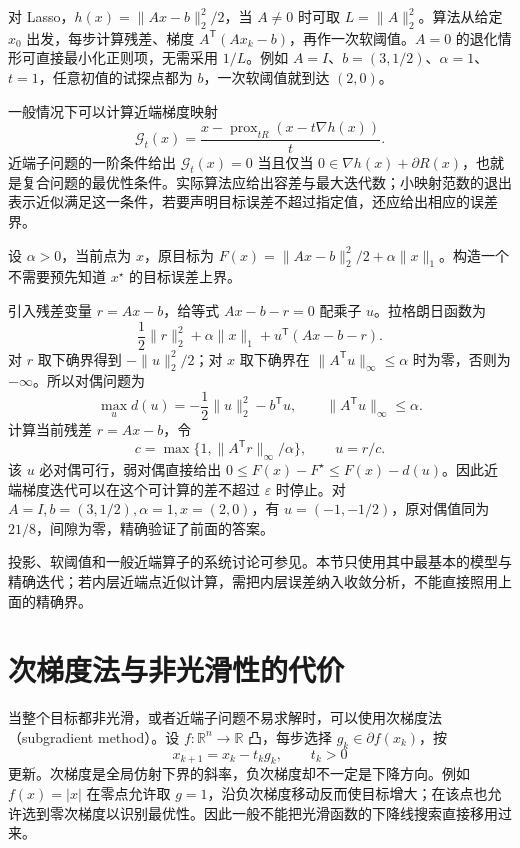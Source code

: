 对 Lasso，$h(x)=\|Ax-b\|_2^2/2$，当 $A\ne0$ 时可取 $L=\|A\|_2^2$。算法从给定 $x_0$ 出发，每步计算残差、梯度 $A^{\mathsf T}(Ax_k-b)$，再作一次软阈值。$A=0$ 的退化情形可直接最小化正则项，无需采用 $1/L$。例如 $A=I$、$b=(3,1/2)$、$\alpha=1$、$t=1$，任意初值的试探点都为 $b$，一次软阈值就到达 $(2,0)$。

一般情况下可以计算近端梯度映射
\[
 \mathcal G_t(x)=\frac{x-\operatorname{prox}_{tR}(x-t\nabla h(x))}{t}.
\]
近端子问题的一阶条件给出 $\mathcal G_t(x)=0$ 当且仅当
$0\in\nabla h(x)+\partial R(x)$，也就是复合问题的最优性条件。实际算法应给出容差与最大迭代数；小映射范数的退出表示近似满足这一条件，若要声明目标误差不超过指定值，还应给出相应的误差界。

\begin{example}
设 $\alpha>0$，当前点为 $x$，原目标为 $F(x)=\|Ax-b\|_2^2/2+\alpha\|x\|_1$。构造一个不需要预先知道 $x^\star$ 的目标误差上界。
\end{example}
\begin{solve}
引入残差变量 $r=Ax-b$，给等式 $Ax-b-r=0$ 配乘子 $u$。拉格朗日函数为
\[
 \frac12\|r\|_2^2+\alpha\|x\|_1+u^{\mathsf T}(Ax-b-r).
\]
对 $r$ 取下确界得到 $-\|u\|_2^2/2$；对 $x$ 取下确界在 $\|A^{\mathsf T}u\|_\infty\leq\alpha$ 时为零，否则为 $-\infty$。所以对偶问题为
\[
 \max_u d(u)=-\frac12\|u\|_2^2-b^{\mathsf T}u,
 \qquad \|A^{\mathsf T}u\|_\infty\leq\alpha.
\]
计算当前残差 $r=Ax-b$，令
\[
 c=\max\{1,\|A^{\mathsf T}r\|_\infty/\alpha\},\qquad u=r/c.
\]
该 $u$ 必对偶可行，弱对偶直接给出 $0\leq F(x)-F^\star\leq F(x)-d(u)$。因此近端梯度迭代可以在这个可计算的差不超过 $\varepsilon$ 时停止。对 $A=I,b=(3,1/2),\alpha=1,x=(2,0)$，有 $u=(-1,-1/2)$，原对偶值同为 $21/8$，间隙为零，精确验证了前面的答案。
\end{solve}

投影、软阈值和一般近端算子的系统讨论可参见\cite{parikh-boyd}。本节只使用其中最基本的模型与精确迭代；若内层近端点近似计算，需把内层误差纳入收敛分析，不能直接照用上面的精确界。

\section{次梯度法与非光滑性的代价}
\label{sec:co-subgradient-method}

当整个目标都非光滑，或者近端子问题不易求解时，可以使用次梯度法（subgradient method）。设 $f:\mathbb R^n\to\mathbb R$ 凸，每步选择 $g_k\in\partial f(x_k)$，按
\[
 x_{k+1}=x_k-t_k g_k,\qquad t_k>0
\]
更新。次梯度是全局仿射下界的斜率，负次梯度却不一定是下降方向。例如 $f(x)=|x|$ 在零点允许取 $g=1$，沿负次梯度移动反而使目标增大；在该点也允许选到零次梯度以识别最优性。因此一般不能把光滑函数的下降线搜索直接移用过来。

